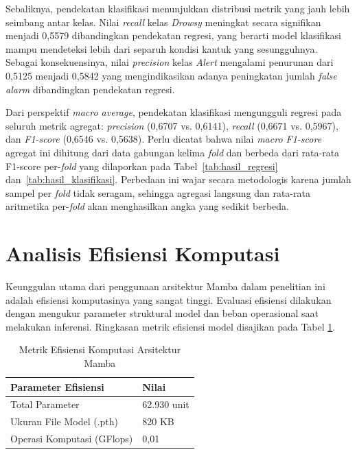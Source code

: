 Sebaliknya, pendekatan klasifikasi menunjukkan distribusi metrik yang jauh lebih seimbang antar kelas. Nilai \textit{recall} kelas \textit{Drowsy} meningkat secara signifikan menjadi 0{,}5579 dibandingkan pendekatan regresi, yang berarti model klasifikasi mampu mendeteksi lebih dari separuh kondisi kantuk yang sesungguhnya. Sebagai konsekuensinya, nilai \textit{precision} kelas \textit{Alert} mengalami penurunan dari 0{,}5125 menjadi 0{,}5842 yang mengindikasikan adanya peningkatan jumlah \textit{false alarm} dibandingkan pendekatan regresi.

Dari perspektif \textit{macro average}, pendekatan klasifikasi
mengungguli regresi pada seluruh metrik agregat: \textit{precision} (0{,}6707 vs. 0{,}6141), \textit{recall} (0{,}6671 vs. 0{,}5967), dan \textit{F1-score} (0{,}6546 vs. 0{,}5638). Perlu dicatat bahwa nilai \textit{macro F1-score} agregat ini dihitung dari data gabungan kelima \textit{fold} dan berbeda dari rata-rata F1-score per-\textit{fold} yang dilaporkan pada Tabel~\ref{tab:hasil_regresi} dan~\ref{tab:hasil_klasifikasi}. Perbedaan ini wajar secara metodologis karena jumlah sampel per \textit{fold} tidak seragam, sehingga agregasi langsung dan rata-rata aritmetika per-\textit{fold} akan menghasilkan angka yang sedikit berbeda.

\section{Analisis Efisiensi Komputasi} \label{IV.Analisis}
Keunggulan utama dari penggunaan arsitektur Mamba dalam penelitian ini adalah efisiensi komputasinya yang sangat tinggi. Evaluasi efisiensi dilakukan dengan mengukur parameter struktural model dan beban operasional saat melakukan inferensi. Ringkasan metrik efisiensi model disajikan pada Tabel \ref{tab:efisiensi}.

\begin{table}[H]
    \centering
    \caption{Metrik Efisiensi Komputasi Arsitektur Mamba}
    \label{tab:efisiensi}
    \begin{tabular}{ll}
        \hline
        \textbf{Parameter Efisiensi} & \textbf{Nilai} \\
        \hline
        Total Parameter & 62.930 unit \\
        Ukuran File Model (.pth) & 820 KB \\
        Operasi Komputasi (GFlops) & 0,01 \\
        \hline
    \end{tabular}
\end{table}

